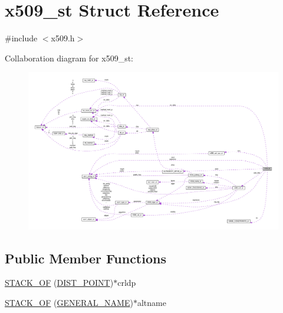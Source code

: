 \hypertarget{structx509__st}{}\section{x509\+\_\+st Struct Reference}
\label{structx509__st}


{\ttfamily \#include $<$x509.\+h$>$}



Collaboration diagram for x509\+\_\+st\+:
\nopagebreak
\begin{figure}[H]
\begin{center}
\leavevmode
\includegraphics[width=350pt]{structx509__st__coll__graph}
\end{center}
\end{figure}
\subsection*{Public Member Functions}
\begin{DoxyCompactItemize}
\item 
\hyperlink{structx509__st_a6cb65861dcb792d87890642d20616234}{S\+T\+A\+C\+K\+\_\+\+OF} (\hyperlink{ossl__typ_8h_a3f28a968d7df90df4349b76c5c65b612}{D\+I\+S\+T\+\_\+\+P\+O\+I\+NT})$\ast$crldp
\item 
\hyperlink{structx509__st_afa1fd8534e0b89a8a3dc70981fcb0219}{S\+T\+A\+C\+K\+\_\+\+OF} (\hyperlink{x509v3_8h_a6688fb8a0c7b8e63f3d47bac3a09eb15}{G\+E\+N\+E\+R\+A\+L\+\_\+\+N\+A\+ME})$\ast$altname
\end{DoxyCompactItemize}
